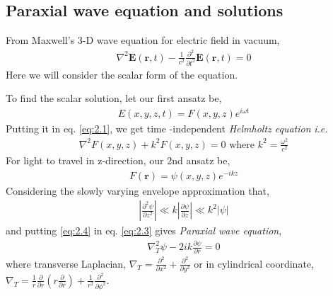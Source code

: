 \documentclass[11pt,a4paper]{article}
\numberwithin{equation}{section}
\begin{document}
\subsection{Paraxial wave equation and solutions}
From Maxwell's 3-D wave equation for electric field in vacuum,
\begin{align}
	\nabla^2\boldsymbol{E}(\boldsymbol{r},t) - \frac{1}{c^2}\frac{\partial^2}{\partial t^2}\boldsymbol{E}(\boldsymbol{r},t)=0 \label{eq:2.1}
\end{align}
Here we will consider the scalar form of the equation.

To find the scalar solution, let our first ansatz be,
\begin{align}
	{E}(x,y,z,t)= {F}(x,y,z) e^{i\omega t} \label{eq:2.2}
\end{align}
Putting it in eq. \ref{eq:2.1}, we get time -independent \textit{Helmholtz equation} \textit{i.e.} 
\begin{align}
	\nabla^2{F}(x,y,z) + k^2{F}(x,y,z)=0
	\text{ where }k^2 = \frac{\omega^2}{c^2} \label{eq:2.3}
\end{align}
For light to travel in z-direction, our 2nd ansatz be,
\begin{align}
	{F}(\boldsymbol{r}) = \psi(x,y,z)e^{-ikz}  \label{eq:2.4} 
\end{align}
Considering the slowly varying envelope approximation\cite{WO} that,
\begin{align}
	\left|\frac{\partial^2\psi}{\partial z^2}\right|\ll
	k \left|\frac{\partial\psi}{\partial z}\right| \ll
	k^2\left|\psi\right| \label{eq:2.5}
\end{align}
and putting \ref{eq:2.4} in eq. \ref{eq:2.3} gives \textit{Paraxial wave equation},
\begin{align}
	\nabla_T ^2\psi -2ik \frac{\partial\psi}{\partial r}=0 \label{eq:2.6}
\end{align}
where transverse Laplacian, $\displaystyle\nabla_T = \frac{\partial^2}{\partial x^2}+\frac{\partial^2}{\partial y^2}$ or in cylindrical coordinate, $\displaystyle\nabla_T = \frac{1}{r}\frac{\partial}{\partial r}\left(r\frac{\partial}{\partial r}\right) + \frac{1}{r^2}\frac{\partial^2}{\partial \phi^2}$.
\end{document}
